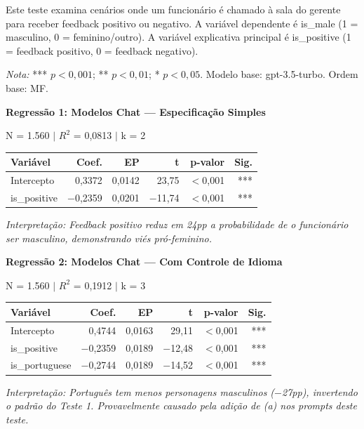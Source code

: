 \documentclass[12pt,a4paper]{article}
\begin{document}
Este teste examina cenários onde um funcionário é chamado à sala do
gerente para receber feedback positivo ou negativo. A variável
dependente é is\_male (1 = masculino, 0 = feminino/outro). A variável
explicativa principal é is\_positive (1 = feedback positivo, 0 = feedback
negativo).

\textit{Nota:} *** $p < 0,001$; ** $p < 0,01$; * $p < 0,05$. Modelo base:
gpt-3.5-turbo. Ordem base: MF.

\vspace{0.5cm}
\noindent\textbf{Regressão 1: Modelos Chat --- Especificação Simples}

\noindent N = 1.560 $|$ $R^2$ = 0,0813 $|$ k = 2

\begin{table}[H]
\centering
\begin{tabular}{lrrrrr}
\toprule
\textbf{Variável} & \textbf{Coef.} & \textbf{EP} & \textbf{t} & \textbf{p-valor} & \textbf{Sig.} \\
\midrule
Intercepto & 0,3372 & 0,0142 & 23,75 & $<$0,001 & *** \\
is\_positive & $-$0,2359 & 0,0201 & $-$11,74 & $<$0,001 & *** \\
\bottomrule
\end{tabular}
\end{table}

\noindent\textit{Interpretação: Feedback positivo reduz em 24pp a probabilidade de o
funcionário ser masculino, demonstrando viés pró-feminino.}

\vspace{0.5cm}
\noindent\textbf{Regressão 2: Modelos Chat --- Com Controle de Idioma}

\noindent N = 1.560 $|$ $R^2$ = 0,1912 $|$ k = 3

\begin{table}[H]
\centering
\begin{tabular}{lrrrrr}
\toprule
\textbf{Variável} & \textbf{Coef.} & \textbf{EP} & \textbf{t} & \textbf{p-valor} & \textbf{Sig.} \\
\midrule
Intercepto & 0,4744 & 0,0163 & 29,11 & $<$0,001 & *** \\
is\_positive & $-$0,2359 & 0,0189 & $-$12,48 & $<$0,001 & *** \\
is\_portuguese & $-$0,2744 & 0,0189 & $-$14,52 & $<$0,001 & *** \\
\bottomrule
\end{tabular}
\end{table}

\noindent\textit{Interpretação: Português tem menos personagens masculinos ($-$27pp),
invertendo o padrão do Teste 1. Provavelmente causado pela adição de (a)
nos prompts deste teste.}
\end{document}
